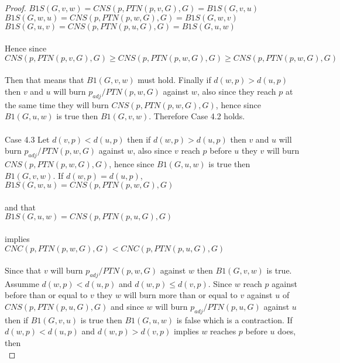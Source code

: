 \documentclass{article}
\begin{document}
\begin{proof}
\(B1S(G,v,w) = CNS(p,PTN(p,v,G),G) = B1S(G,v,u)\) 
\\

\(B1S(G,w,u) = CNS(p,PTN(p,w,G),G) = B1S(G,w,v)\)
\\

\(B1S(G,u,v) = CNS(p,PTN(p,u,G),G) = B1S(G,u,w)\)
\\\\
Hence since
\\

\(CNS(p,PTN(p,v,G),G) \ge CNS(p,PTN(p,w,G),G) \ge CNS(p,PTN(p,w,G),G) \)
\\\\
Then that means that \(B1(G,v,w)\) must hold. Finally if \(d(w,p) > d(u,p)\) then \(v\) and \(u\) will burn \(p_{adj}/PTN(p, w, G)\) against \(w\),
also since they reach \(p\) at the same time they will burn \(CNS(p,PTN(p,w,G),G)\), hence since \(B1(G,u,w)\) is true then \(B1(G,v,w)\). 
Therefore Case 4.2 holds.
\\\\
Case 4.3 Let \(d(v,p) < d(u,p)\) then if \(d(w,p) > d(u,p)\) then \(v\) and \(u\) will burn \(p_{adj}/PTN(p, w, G)\) against \(w\),
also since \(v\) reach \(p\) before \(u\) they \(v\) will burn \(CNS(p,PTN(p,w,G),G)\), hence since \(B1(G,u,w)\) is true then \(B1(G,v,w)\).
If \(d(w,p) = d(u,p)\), 
\\

\(B1S(G,w,u) = CNS(p,PTN(p,w,G),G)\)
\\\\
and that
\\

\(B1S(G,u,w) = CNS(p,PTN(p,u,G),G)\)
\\\\
implies
\\

\(CNC(p,PTN(p,w,G),G) < CNC(p,PTN(p,u,G),G)\)
\\\\
Since that \(v\) will burn \(p_{adj}/PTN(p, w, G)\) against \(w\) then \(B1(G,v,w)\) is true.
Assumme \(d(w,p) < d(u,p)\) and \(d(w,p) \le d(v,p)\). 
Since \(w\) reach \(p\) against before than or equal to \(v\) they \(w\) will burn more than or equal to \(v\) against \(u\) of \(CNS(p,PTN(p,u,G),G)\)
and since \(w\) will burn \(p_{adj}/PTN(p, u, G)\) against \(u\) then if \(B1(G,v,u)\) is true then \(B1(G,u,w)\) is false which is a contraction.
If \(d(w,p) < d(u,p)\) and \(d(w,p) > d(v,p)\) implies \(w\) reaches \(p\) before \(u\) does, then 
\\


\end{proof}
\end{document}
